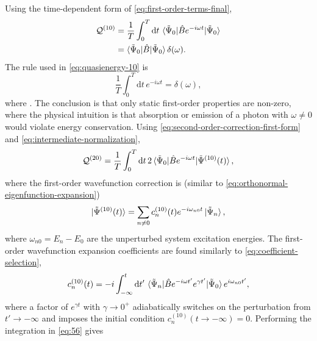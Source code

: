 \documentclass[%
class = book,%
crop = false,%
float = true,%
multi = true,%
preview = false,%
]{standalone}
\begin{document}
Using the time-dependent form of \eqref{eq:first-order-terms-final},
\begin{equation}
  \label{eq:quasienergy-10}
  \begin{aligned}
    \mathcal{Q}^{(10)} &= \frac{1}{T} \int_{0}^{T} \mathrm{d}t \, \braket{\tilde{\Psi}_{0}|\hat{B}e^{-i\omega t}|\tilde{\Psi}_{0}} \\
    &= \braket{\tilde{\Psi}_{0}|\hat{B}|\tilde{\Psi}_{0}} \delta(\omega).
\end{aligned}
\end{equation}
The rule used in \eqref{eq:quasienergy-10} is
\begin{equation}
  \label{eq:kronecker-delta-frequencies}
  \frac{1}{T} \int_{0}^{T} \mathrm{d}t \, e^{-i\omega t} = \delta(\omega),
\end{equation}
where . The conclusion is that only static first-order properties are non-zero, where the physical intuition is that absorption or emission of a photon with \(\omega \neq 0\) would violate energy conservation. Using \eqref{eq:second-order-correction-first-form} and \eqref{eq:intermediate-normalization},
\begin{equation}
  \label{eq:quasienergy-20}
  \mathcal{Q}^{(20)} = \frac{1}{T} \int_{0}^{T} \mathrm{d}t \, 2\braket{\tilde{\Psi}_{0}|\hat{B}e^{-i\omega t}|\tilde{\Psi}^{(10)}(t)},
\end{equation}
where the first-order wavefunction correction is (similar to \eqref{eq:orthonormal-eigenfunction-expansion})
\begin{equation}
  \label{eq:first-order-wavefunction-td}
  \ket{\tilde{\Psi}^{(10)}(t)} = \sum_{n\neq 0} c_{n}^{(10)}(t) e^{-i\omega_{n0}t} \ket{\tilde{\Psi}_{n}},
\end{equation}
where \(\omega_{n0} = E_{n} - E_{0}\) are the unperturbed system excitation energies. The first-order wavefunction expansion coefficients are found similarly to \eqref{eq:coefficient-selection},
\begin{equation}
  \label{eq:56}
  c_{n}^{(10)}(t) = -i \int_{-\infty}^{t} \mathrm{d}t' \, \braket{\tilde{\Psi}_{n}|\hat{B}e^{-i\omega t'}e^{\gamma t'}|\tilde{\Psi}_{0}}e^{i\omega_{n0}t'},
\end{equation}
where a factor of \(e^{\gamma t}\) with \(\gamma \rightarrow 0^{+}\) adiabatically switches on the perturbation from \(t' \rightarrow -\infty\) and imposes the initial condition \(c_{n}^{(10)}(t \rightarrow -\infty) = 0\). Performing the integration in \eqref{eq:56} gives
\end{document}

